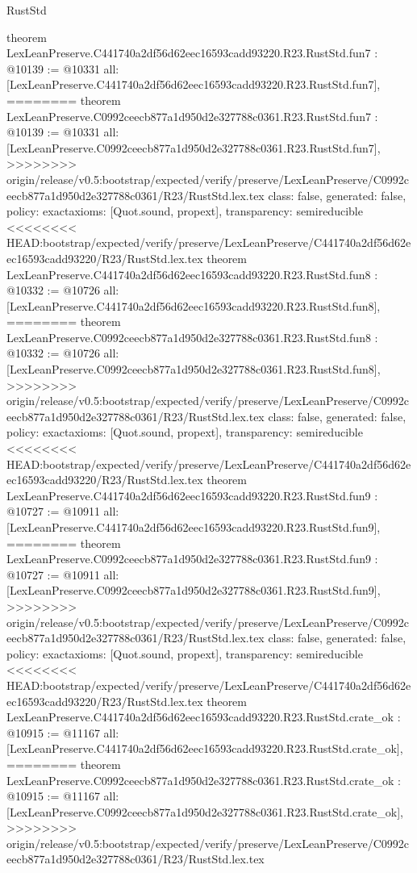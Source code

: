 \begin{lexlean}{RustStd}
\begin{coremodule}
{\begin{coremodule}
{{{{{{{{{theorem LexLeanPreserve.C441740a2df56d62eec16593cadd93220.R23.RustStd.fun7 : @10139 := @10331 {
  all: [LexLeanPreserve.C441740a2df56d62eec16593cadd93220.R23.RustStd.fun7],
========
theorem LexLeanPreserve.C0992ceecb877a1d950d2e327788c0361.R23.RustStd.fun7 : @10139 := @10331 {
  all: [LexLeanPreserve.C0992ceecb877a1d950d2e327788c0361.R23.RustStd.fun7],
>>>>>>>> origin/release/v0.5:bootstrap/expected/verify/preserve/LexLeanPreserve/C0992ceecb877a1d950d2e327788c0361/R23/RustStd.lex.tex
  class: false,
  generated: false,
  policy: exact{axioms: [Quot.sound, propext]},
  transparency: semireducible
}
<<<<<<<< HEAD:bootstrap/expected/verify/preserve/LexLeanPreserve/C441740a2df56d62eec16593cadd93220/R23/RustStd.lex.tex
theorem LexLeanPreserve.C441740a2df56d62eec16593cadd93220.R23.RustStd.fun8 : @10332 := @10726 {
  all: [LexLeanPreserve.C441740a2df56d62eec16593cadd93220.R23.RustStd.fun8],
========
theorem LexLeanPreserve.C0992ceecb877a1d950d2e327788c0361.R23.RustStd.fun8 : @10332 := @10726 {
  all: [LexLeanPreserve.C0992ceecb877a1d950d2e327788c0361.R23.RustStd.fun8],
>>>>>>>> origin/release/v0.5:bootstrap/expected/verify/preserve/LexLeanPreserve/C0992ceecb877a1d950d2e327788c0361/R23/RustStd.lex.tex
  class: false,
  generated: false,
  policy: exact{axioms: [Quot.sound, propext]},
  transparency: semireducible
}
<<<<<<<< HEAD:bootstrap/expected/verify/preserve/LexLeanPreserve/C441740a2df56d62eec16593cadd93220/R23/RustStd.lex.tex
theorem LexLeanPreserve.C441740a2df56d62eec16593cadd93220.R23.RustStd.fun9 : @10727 := @10911 {
  all: [LexLeanPreserve.C441740a2df56d62eec16593cadd93220.R23.RustStd.fun9],
========
theorem LexLeanPreserve.C0992ceecb877a1d950d2e327788c0361.R23.RustStd.fun9 : @10727 := @10911 {
  all: [LexLeanPreserve.C0992ceecb877a1d950d2e327788c0361.R23.RustStd.fun9],
>>>>>>>> origin/release/v0.5:bootstrap/expected/verify/preserve/LexLeanPreserve/C0992ceecb877a1d950d2e327788c0361/R23/RustStd.lex.tex
  class: false,
  generated: false,
  policy: exact{axioms: [Quot.sound, propext]},
  transparency: semireducible
}
<<<<<<<< HEAD:bootstrap/expected/verify/preserve/LexLeanPreserve/C441740a2df56d62eec16593cadd93220/R23/RustStd.lex.tex
theorem LexLeanPreserve.C441740a2df56d62eec16593cadd93220.R23.RustStd.crate_ok : @10915 := @11167 {
  all: [LexLeanPreserve.C441740a2df56d62eec16593cadd93220.R23.RustStd.crate_ok],
========
theorem LexLeanPreserve.C0992ceecb877a1d950d2e327788c0361.R23.RustStd.crate_ok : @10915 := @11167 {
  all: [LexLeanPreserve.C0992ceecb877a1d950d2e327788c0361.R23.RustStd.crate_ok],
>>>>>>>> origin/release/v0.5:bootstrap/expected/verify/preserve/LexLeanPreserve/C0992ceecb877a1d950d2e327788c0361/R23/RustStd.lex.tex
}}}}}}}}}}}}}}
\end{coremodule}}
\end{coremodule}
\end{lexlean}

